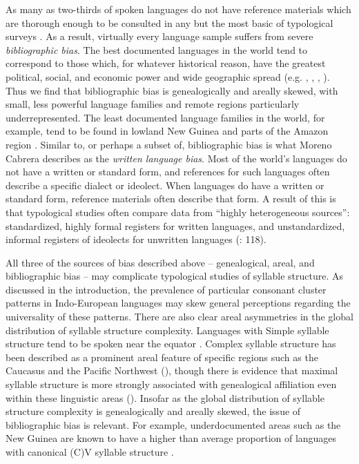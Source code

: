   As many as two-thirds of spoken languages do not have reference materials which are thorough enough to be consulted in any but the most basic of typological surveys \citep[106]{Bakker2011}. As a result, virtually every language sample suffers from severe \textit{bibliographic bias}. The best documented languages in the world tend to correspond to those which, for whatever historical reason, have the greatest political, social, and economic power and wide geographic spread (e.g. , , , ). Thus we find that bibliographic bias is genealogically and areally skewed, with small, less powerful language families and remote regions particularly underrepresented. The least documented language families in the world, for example, tend to be found in lowland New Guinea and parts of the Amazon region \citep{Hammarström2010}. Similar to, or perhaps a subset of, bibliographic bias is what Moreno Cabrera describes as the \textit{written language bias}. Most of the world’s languages do not have a written or standard form, and references for such languages often describe a specific dialect or ideolect. When languages do have a written or standard form, reference materials often describe that form. A result of this is that typological studies often compare data from “highly heterogeneous sources”: standardized, highly formal registers for written languages, and unstandardized, informal registers of ideolects for unwritten languages (\citeyear{MorenoCabrera2008}: 118). 

  All three of the sources of bias described above -- genealogical, areal, and bibliographic bias -- may complicate typological studies of syllable structure. As discussed in the introduction, the prevalence of particular consonant cluster patterns in Indo-European languages may skew general perceptions regarding the universality of these patterns. There are also clear areal asymmetries in the global distribution of syllable structure complexity. Languages with Simple syllable structure tend to be spoken near the equator \citep{Maddieson2013a}. Complex syllable structure has been described as a prominent areal feature of specific regions such as the Caucasus \citep{Chirikba2008} and the Pacific Northwest (\citealt{ThompsonKinkade1990}), though there is evidence that maximal syllable structure is more strongly associated with genealogical affiliation even within these linguistic areas (\citealt{NapoleãodeSouza2017}). Insofar as the global distribution of syllable structure complexity is genealogically and areally skewed, the issue of bibliographic bias is relevant. For example, underdocumented areas such as the New Guinea are known to have a higher than average proportion of languages with canonical (C)V syllable structure \citep{Maddieson2013a}.

